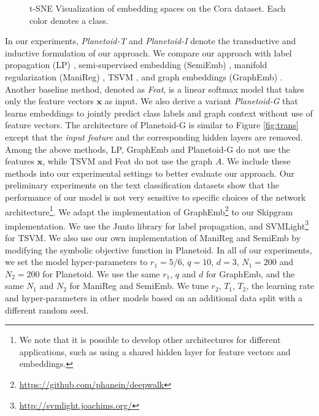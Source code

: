 \begin{figure*}[tb]
\vskip 0.2in
\centering
{}
\caption{t-SNE Visualization of embedding spaces on the Cora dataset. Each color denotes a class.}
\label{fig:vis}
\vskip -0.2in
\end{figure*}

In our experiments, \textit{Planetoid-T} and \textit{Planetoid-I} denote the transductive and inductive formulation of our approach.
We compare our approach with label propagation (LP) \cite{zhu2003semi}, semi-supervised embedding (SemiEmb) \cite{weston2012deep}, manifold regularization (ManiReg) \cite{belkin2006manifold}, TSVM \cite{joachims1999transductive}, and graph embeddings (GraphEmb) \cite{perozzi2014deepwalk}.
Another baseline method, denoted as \textit{Feat}, is a linear softmax model that takes only the feature vectors $\mathbf{x}$ as input. We also derive a variant \textit{Planetoid-G} that learns embeddings to jointly predict class labels and graph context without use of feature vectors. The architecture of Planetoid-G is similar to Figure \ref{fig:trans} except that the \textit{input feature} and the corresponding hidden layers are removed.
Among the above methods, LP, GraphEmb and Planetoid-G do not use the features $\mathbf{x}$, while TSVM and Feat do not use the graph $A$. We include these methods into our experimental settings to better evaluate our approach.
Our preliminary experiments on the text classification datasets show that the performance of our model is not very sensitive to specific choices of the network architecture\footnote{We note that 
it is possible to develop other architectures for different 
applications, such as using a shared hidden layer for feature vectors and embeddings.}.
We adapt the implementation of GraphEmb\footnote{\url{https://github.com/phanein/deepwalk}} to our Skipgram implementation. We use the Junto library \cite{talukdar2009new} for label propagation, and SVMLight\footnote{\url{http://svmlight.joachims.org/}} for TSVM. We also use our own implementation of ManiReg and SemiEmb by modifying the symbolic objective function in Planetoid. In all of our experiments, we set the model hyper-parameters to $r_1 = 5/6$, $q = 10$, $d = 3$, $N_1 = 200$ and $N_2 = 200$ for Planetoid.
We use the same $r_1$, $q$ and $d$ for GraphEmb, and the same $N_1$ and $N_2$ for ManiReg and SemiEmb. We tune $r_2$, $T_1$, $T_2$, the learning rate and hyper-parameters in other models based on an additional data split with a different random seed.


